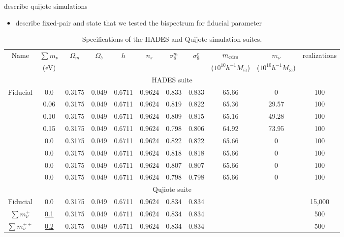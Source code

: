 \documentclass[12pt, letterpaper, preprint]{aastex62}
\newcommand{\smnu}{\sum m_\nu}
\newcommand{\bitem}{\begin{itemize}}
\newcommand{\eitem}{\end{itemize}}
\newcommand{\ch}[1]{{\color{orange}{\bf CH:} #1}}
\begin{document}
\ch{describe quijote simulations} 
\bitem 
\item describe fixed-pair and state that we tested the bispectrum for fiducial parameter
\eitem

\begin{table}
\caption{Specifications of the HADES and Quijote simulation suites.} 
\begin{center}
\begin{tabular}{ccccccccccc} \toprule
    Name  &$\smnu$ & $\Omega_m$ & $\Omega_b$ & $h$ & $n_s$ & $\sigma^m_8$ & $\sigma^c_8$ & $m_{\rm cdm}$ & $m_\nu$ & realizations \\
      &({\footnotesize eV}) & & & & & & & ({\footnotesize $10^{10}h^{-1}M_\odot$}) & ({\footnotesize $10^{10}h^{-1}M_\odot$}) & \\[3pt] \hline\hline
    \multicolumn{11}{c}{HADES suite} \\ \hline
    Fiducial    & 0.0   & 0.3175 & 0.049 & 0.6711 & 0.9624 & 0.833 & 0.833 & 65.66 & 0      &100 \\ 
                & 0.06  & 0.3175 & 0.049 & 0.6711 & 0.9624 & 0.819 & 0.822 & 65.36 & 29.57  &100 \\ 
                & 0.10  & 0.3175 & 0.049 & 0.6711 & 0.9624 & 0.809 & 0.815 & 65.16 & 49.28  &100 \\ 
                & 0.15  & 0.3175 & 0.049 & 0.6711 & 0.9624 & 0.798 & 0.806 & 64.92 & 73.95  &100 \\ 
                & 0.0   & 0.3175 & 0.049 & 0.6711 & 0.9624 & 0.822 & 0.822 & 65.66 & 0      &100 \\ 
                & 0.0   & 0.3175 & 0.049 & 0.6711 & 0.9624 & 0.818 & 0.818 & 65.66 & 0      &100 \\ 
                & 0.0   & 0.3175 & 0.049 & 0.6711 & 0.9624 & 0.807 & 0.807 & 65.66 & 0      &100 \\ 
                & 0.0   & 0.3175 & 0.049 & 0.6711 & 0.9624 & 0.798 & 0.798 & 65.66 & 0      &100 \\[3pt]
    \hline \hline
    \multicolumn{11}{c}{Qujiote suite} \\ \hline
    Fiducial 	    & 0.0         & 0.3175 & 0.049 & 0.6711 & 0.9624 & 0.834 & 0.834 & & & 15,000 \\ 
    $\smnu^+$       & \underline{0.1}   & 0.3175 & 0.049 & 0.6711 & 0.9624 & 0.834 & 0.834 & & & 500 \\ 
    $\smnu^{++}$    & \underline{0.2}   & 0.3175 & 0.049 & 0.6711 & 0.9624 & 0.834 & 0.834 & & & 500 \\ 

\end{tabular}
\end{center}
\end{table}
\end{document}
